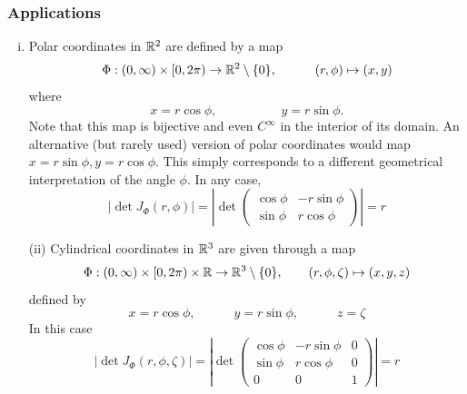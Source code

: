 \documentclass[12pt, t]{beamer}
\begin{document}
\begin{frame}[allowframebreaks]
    \frametitle{Applications}
    \begin{enumerate}[(i)]
        \item Polar coordinates in $\mathbb{R}^2$ are defined by a map
              \[\Phi:(0,\infty)\times[0,2\pi)\to\mathbb{R}^2\setminus\{0\},
                  \qquad\quad(r,\phi)\mapsto(x,y)\]
              where
              \[x=r\cos\phi,\qquad\qquad\quad
                  y=r\sin\phi.\]
              Note that this map is bijective and even $C^\infty$ in the interior of its
              domain. An alternative (but rarely used) version of polar coordinates
              would map $x=r\sin\phi,y=r\cos\phi$. This simply corresponds to a
              dif{}ferent geometrical interpretation of the angle $\phi$. In any case,
              \[|\det J_\Phi(r,\phi)|=\left|\det\begin{pmatrix}
                      \cos\phi & -r\sin\phi \\
                      \sin\phi & r\cos\phi
                  \end{pmatrix}\right|=r\]
    \end{enumerate}
    \begin{itemize}
        \item[(ii)] Cylindrical coordinates in $\mathbb{R}^3$ are given through a map
            \[\Phi:(0,\infty)\times[0,2\pi)\times\mathbb{R}\to\mathbb{R}^3\setminus\{0\},\qquad
                (r,\phi,\zeta)\mapsto(x,y,z)\]
            defined by
            \[x=r\cos\phi,\qquad\quad y=r\sin\phi,\qquad\quad z=\zeta\]
            In this case
            \[|\det J_\Phi(r,\phi,\zeta)|=\left|\det\begin{pmatrix}
                    \cos\phi & -r\sin\phi & 0 \\
                    \sin\phi & r\cos\phi  & 0 \\
                    0        & 0          & 1
                \end{pmatrix}\right|=r\]


\end{itemize}
\end{frame}
\end{document}
